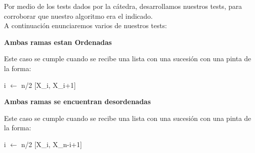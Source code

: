 \indent Por medio de los tests dados por la c\'atedra, desarrollamos nuestros tests,
para corroborar que nuestro algoritmo era el indicado.\\

A continuaci\'on enunciaremos varios de nuestros tests:\\

\begin{center}
 \textbf{Ambas ramas estan Ordenadas}
\end{center}
 Este caso se cumple cuando se recibe una lista con una sucesi\'on con una pinta de la forma:
 
 {i $\gets$ n/2} [X\_i, X\_{i+1}] 


\begin{center}
 \textbf{Ambas ramas se encuentran desordenadas}
\end{center}
 Este caso se cumple cuando se recibe una lista con una sucesi\'on con una pinta de la forma:
 
 {i $\gets$ n/2} [X\_i, X\_{n-i+1}] 

